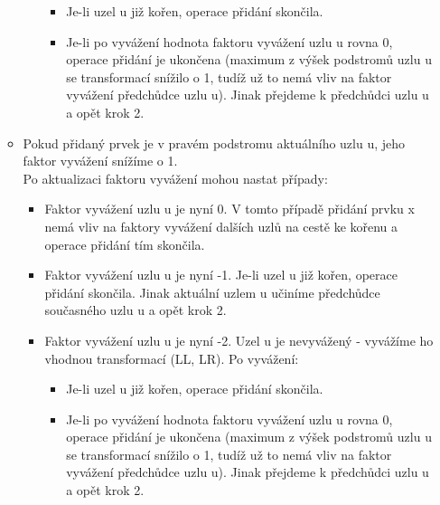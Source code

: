\documentclass[10pt,a4paper]{article}
\begin{document}
\begin{enumerate}
\begin{itemize}
\begin{itemize}
			\begin{itemize}
				\item Je-li uzel u již kořen, operace přidání skončila.
				\item Je-li po vyvážení hodnota faktoru vyvážení uzlu u rovna 0, operace přidání je ukončena (maximum z výšek podstromů uzlu u se transformací snížilo o 1, tudíž už to nemá vliv na faktor vyvážení předchůdce uzlu u). Jinak přejdeme k předchůdci uzlu u a opět krok 2.
			\end{itemize}
		\end{itemize}
		\item Pokud přidaný prvek je v pravém podstromu aktuálního uzlu u, jeho faktor vyvážení snížíme o 1. \\
		Po aktualizaci faktoru vyvážení mohou nastat případy:
		\begin{itemize}
			\item Faktor vyvážení uzlu u je nyní 0. V tomto případě přidání prvku x nemá vliv na faktory vyvážení dalších uzlů na cestě ke kořenu a operace přidání tím skončila.
			\item Faktor vyvážení uzlu u je nyní -1. Je-li uzel u již kořen, operace přidání skončila. Jinak aktuální uzlem u učiníme předchůdce současného uzlu u a opět krok 2.
			\item Faktor vyvážení uzlu u je nyní -2. Uzel u je nevyvážený - vyvážíme ho vhodnou transformací (LL, LR). Po vyvážení:
			\begin{itemize}
				\item Je-li uzel u již kořen, operace přidání skončila.
				\item Je-li po vyvážení hodnota faktoru vyvážení uzlu u rovna 0, operace přidání je ukončena (maximum z výšek podstromů uzlu u se transformací snížilo o 1, tudíž už to nemá vliv na faktor vyvážení předchůdce uzlu u). Jinak přejdeme k předchůdci uzlu u a opět krok 2.
			\end{itemize}
		\end{itemize}
	\end{itemize}
\end{enumerate}
\end{document}
